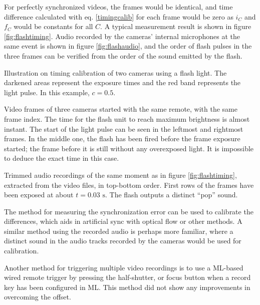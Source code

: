 For perfectly synchronized videos, the frames would be identical, and time difference calculated with eq. \ref{timingcalib} for each frame would be zero as $i_C$ and $f_C$ would be constants for all $C$.
A typical measurement result is shown in figure \ref{fig:flashtiming}.
Audio recorded by the cameras' internal microphones at the same event is shown in figure \ref{fig:flashaudio}, and the order of flash pulses in the three frames can be verified from the order of the sound emitted by the flash.

{Illustration on timing calibration of two cameras using a flash light.
The darkened areas represent the exposure times and the red band represents the light pulse.
In this example, $c = 0.5$.
}

{Video frames of three cameras started with the same remote, with the same frame index.
The time for the flash unit to reach maximum brightness is almost instant.
The start of the light pulse can be seen in the leftmost and rightmost frames.
In the middle one, the flash has been fired before the frame exposure started;
the frame before it is still without any overexposed light.
It is impossible to deduce the exact time in this case.
}

{Trimmed audio recordings of the same moment as in figure \ref{fig:flashtiming}, extracted from the video files, in top-bottom order.
First rows of the frames have been exposed at about $t = 0.03 \text{ s}$.
The flash outputs a distinct ``pop'' sound.
}


The method for measuring the synchronization error can be used to calibrate the differences, which aids in artificial sync with optical flow or other methods.
A similar method using the recorded audio is perhaps more familiar, where a distinct sound in the audio tracks recorded by the cameras would be used for calibration.

Another method for triggering multiple video recordings is to use a ML-based wired remote trigger by pressing the half-shutter, or focus button when a record key has been configured in ML.
This method did not show any improvements in overcoming the offset.

